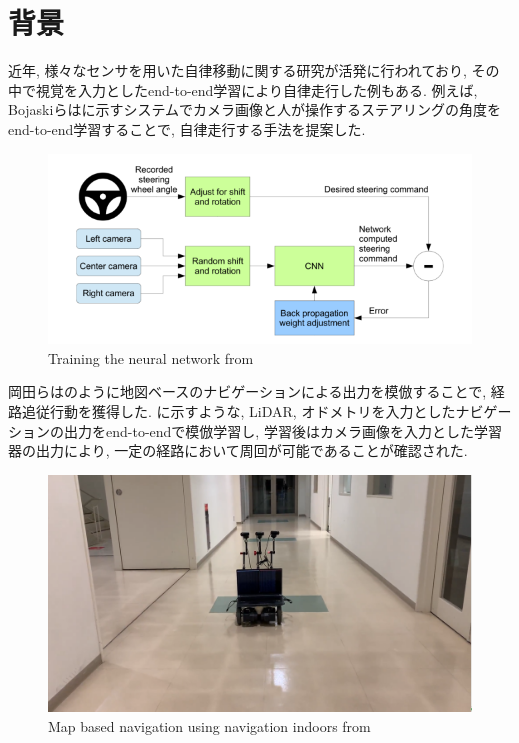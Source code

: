 
\section{背景}
近年, 様々なセンサを用いた自律移動に関する研究が活発に行われており, その中で視覚を入力としたend-to-end学習により自律走行した例もある. 例えば, Bojaskiらはに示すシステムでカメラ画像と人が操作するステアリングの角度をend-to-end学習することで, 自律走行する手法を提案した\cite{bojaski}.

\vspace{20mm}

\begin{figure}[hbtp]
\centering
\includegraphics[keepaspectratio, scale=0.5]
{images/bojaski.png}
\caption{Training the neural network from \cite{bojaski}}
\label{Fig:bojaski}
\end{figure}

\newpage
岡田らはのように地図ベースのナビゲーションによる出力を模倣することで, 経路追従行動を獲得した\cite{okada-si2020}. に示すような, LiDAR, オドメトリを入力としたナビゲーションの出力をend-to-endで模倣学習し, 学習後はカメラ画像を入力とした学習器の出力により, 一定の経路において周回が可能であることが確認された. 

\vspace{20mm}

\begin{figure}[h]
     \centering
     \includegraphics[keepaspectratio, scale=0.15]
     {images/tsudanuma2-3.png}
     \caption{Map based navigation using navigation indoors from \cite{okada-si2020}}
     \label{Fig:tsudanuma2-3}
     \end{figure}


